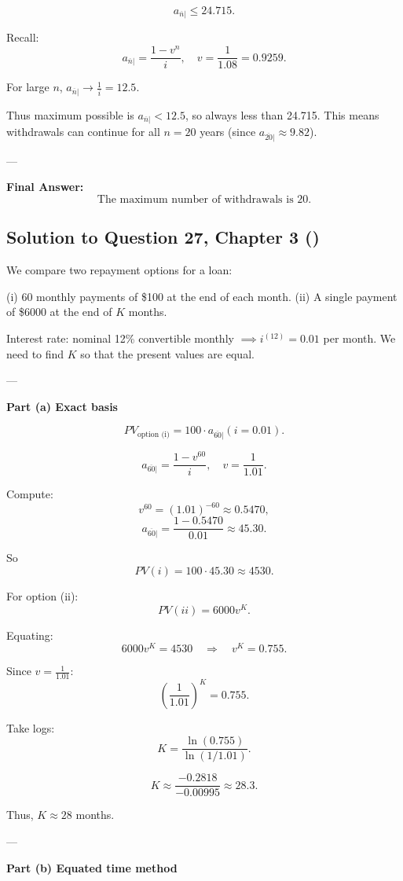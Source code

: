 \documentclass[12pt, a4paper]{article}
\begin{document}
{\[
a_{\overline{n}|} \leq 24.715.
\]

Recall:
\[
a_{\overline{n}|} = \frac{1-v^n}{i}, \quad v=\frac{1}{1.08}=0.9259.
\]

For large $n$, $a_{\overline{n}|} \to \frac{1}{i} = 12.5$.

Thus maximum possible is $a_{\overline{n}|} < 12.5$, so always less than 24.715.  
This means withdrawals can continue for all $n=20$ years (since $a_{\overline{20}|} \approx 9.82$).

---

\textbf{Final Answer:}
\[
\boxed{\text{The maximum number of withdrawals is 20.}}
\]

\subsection*{Solution to Question 27, Chapter 3 (\cite{toi3rd})}

We compare two repayment options for a loan:

(i) 60 monthly payments of \$100 at the end of each month.  
(ii) A single payment of \$6000 at the end of $K$ months.  

Interest rate: nominal 12\% convertible monthly $\implies i^{(12)} = 0.01$ per month.  
We need to find $K$ so that the present values are equal.

---

\textbf{Part (a) Exact basis}

\[
PV_{\text{option (i)}} = 100 \cdot a_{\overline{60}|}(i=0.01).
\]

\[
a_{\overline{60}|} = \frac{1-v^{60}}{i}, 
\quad v=\frac{1}{1.01}.
\]

Compute:
\[
v^{60} = (1.01)^{-60} \approx 0.5470,
\]
\[
a_{\overline{60}|} = \frac{1-0.5470}{0.01} \approx 45.30.
\]

So
\[
PV(i) = 100 \cdot 45.30 \approx 4530.
\]

For option (ii):
\[
PV(ii) = 6000 v^K.
\]

Equating:
\[
6000 v^K = 4530 \quad \Rightarrow \quad v^K = 0.755.
\]

Since $v=\tfrac{1}{1.01}$:
\[
\left(\frac{1}{1.01}\right)^K = 0.755.
\]

Take logs:
\[
K = \frac{\ln(0.755)}{\ln(1/1.01)}.
\]

\[
K \approx \frac{-0.2818}{-0.00995} \approx 28.3.
\]

Thus, $K \approx 28$ months.

---

\textbf{Part (b) Equated time method}

}
\end{document}
